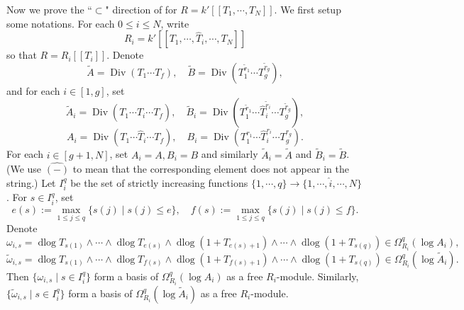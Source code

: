 \documentclass[11pt]{amsart}
\newcommand{\ra}{\rightarrow}
\newcommand{\Div}{\operatorname{Div}}
\newcommand{\dlog}{\operatorname{dlog}}
\renewcommand{\hat}{\widehat}
\renewcommand{\tilde}{\widetilde}
\theoremstyle{plain}
\theoremstyle{definition}
\numberwithin{equation}{prop}
\begin{document}
Now we prove the ``$\subset$" direction of  for $R=k'[[T_1,\cdots,T_N]]$.
We first setup some notations.
For each $0\le i\le N$, write 
$$R_i=k'[[T_1,\cdots,\hat T_i,\cdots, T_N]]$$ 
so that $R=R_i[[T_i]]$.
Denote 
$$\tilde A=\Div(T_1\cdots T_f), \quad
\tilde B=\Div(T_1^{\tilde r_1}\cdots  T_g^{\tilde r_g}),$$
and for each $i\in [1,g]$, set
$$\tilde A_i=\Div(T_1\cdots\hat T_i\cdots T_f), \quad
\tilde B_i=\Div(T_1^{\tilde r_1}\cdots \hat T_i^{\tilde r_i}\cdots T_g^{\tilde r_g}),$$
$$ A_i=\Div(T_1\cdots \hat T_i\cdots T_f), \quad
B_i=\Div(T_1^{r_1}\cdots  \hat T_i^{r_i}\cdots T_g^{r_g}).$$
For each $i\in [g+1,N]$, set $A_i=A, B_i=B$ and similarly $\tilde A_i=\tilde A$ and $\tilde B_i=\tilde B$.
(We use $\hat{(-)}$ to mean that the corresponding element does not appear in the string.)
Let $I_i^q$ be the set of strictly increasing functions $\{1,\cdots,q\}\ra \{1,\cdots,\hat i,\cdots , N\}$. 
For $s\in I_i^q$, set 
$$e(s):=\max_{1\le j\le q}\{s(j)\mid s(j)\le e \},
\quad
f(s):=\max_{1\le j\le q}\{s(j)\mid s(j)\le f\}.$$
Denote 
$$\omega_{i,s}= \dlog T_{s(1)}\wedge\cdots \wedge \dlog T_{e(s)}\wedge 
\dlog (1+T_{e(s)+1})\wedge \cdots\wedge \dlog (1+T_{s(q)})
\in \Omega^q_{R_i}(\log A_i),$$
$$\tilde \omega_{i,s}= \dlog T_{s(1)}\wedge\cdots \wedge \dlog T_{f(s)}\wedge 
\dlog (1+T_{f(s)+1})\wedge \cdots\wedge \dlog (1+T_{s(q)})
\in \Omega^q_{R_i}(\log \tilde A_i).$$
Then $\{\omega_{i,s}\mid s\in I_i^q\}$ form a basis of $\Omega^q_{R_i}(\log A_i)$ as a free $R_i$-module.
Similarly, $\{\tilde \omega_{i,s}\mid s\in I_i^q\}$ form a basis of $\Omega^q_{R_i}(\log \tilde A_i)$ as a free $R_i$-module.
\end{document}
